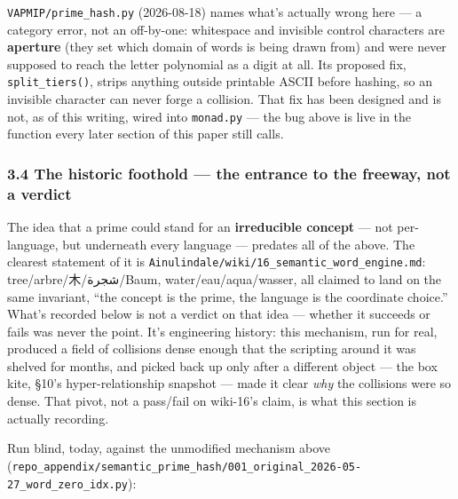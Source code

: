 \documentclass[
  10pt,
]{article}
\begin{document}
\texttt{VAPMIP/prime\_hash.py} (2026-08-18) names what's actually wrong
here --- a category error, not an off-by-one: whitespace and invisible
control characters are \textbf{aperture} (they set which domain of words
is being drawn from) and were never supposed to reach the letter
polynomial as a digit at all. Its proposed fix, \texttt{split\_tiers()},
strips anything outside printable ASCII before hashing, so an invisible
character can never forge a collision. That fix has been designed and is
not, as of this writing, wired into \texttt{monad.py} --- the bug above
is live in the function every later section of this paper still calls.

\hypertarget{the-historic-foothold-the-entrance-to-the-freeway-not-a-verdict}{%
\subsubsection{3.4 The historic foothold --- the entrance to the
freeway, not a
verdict}\label{the-historic-foothold-the-entrance-to-the-freeway-not-a-verdict}}

The idea that a prime could stand for an \textbf{irreducible concept}
--- not per-language, but underneath every language --- predates all of
the above. The clearest statement of it is
\texttt{Ainulindale/wiki/16\_semantic\_word\_engine.md}:
tree/arbre/木/شجرة/Baum, water/eau/aqua/wasser, all claimed to land on
the same invariant, ``the concept is the prime, the language is the
coordinate choice.'' What's recorded below is not a verdict on that idea
--- whether it succeeds or fails was never the point. It's engineering
history: this mechanism, run for real, produced a field of collisions
dense enough that the scripting around it was shelved for months, and
picked back up only after a different object --- the box kite, §10's
hyper-relationship snapshot --- made it clear \emph{why} the collisions
were so dense. That pivot, not a pass/fail on wiki-16's claim, is what
this section is actually recording.

Run blind, today, against the unmodified mechanism above
(\texttt{repo\_appendix/semantic\_prime\_hash/001\_original\_2026-05-27\_word\_zero\_idx.py}):
\end{document}
